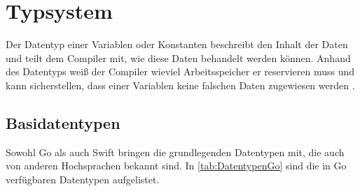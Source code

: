 \chapter{Typsystem}
\label{ch:Typsystem}
Der Datentyp einer Variablen oder Konstanten beschreibt den Inhalt der Daten und teilt dem Compiler mit, wie diese Daten behandelt werden können. 
Anhand des Datentyps weiß der Compiler wieviel Arbeitsspeicher er reservieren muss und kann sicherstellen, dass einer Variablen keine falschen Daten zugewiesen werden \cite[S.62]{Mathias.2016}.

\section{Basidatentypen}
Sowohl Go als auch Swift bringen die grundlegenden Datentypen mit, die auch von anderen Hochsprachen bekannt sind.
In \autoref{tab:DatentypenGo} sind die in Go verfügbaren Datentypen aufgelistet.

